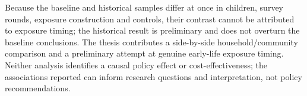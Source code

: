 Because the baseline and historical samples differ at once in children, survey rounds, exposure construction and controls, their contrast cannot be attributed to exposure timing; the historical result is preliminary and does not overturn the baseline conclusions. The thesis contributes a side-by-side household/community comparison and a preliminary attempt at genuine early-life exposure timing. Neither analysis identifies a causal policy effect or cost-effectiveness; the associations reported can inform research questions and interpretation, not policy recommendations.
